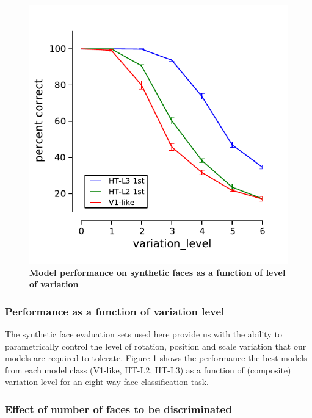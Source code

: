 \begin{figure}[ht]
    \centering
    \includegraphics[scale=0.8]{figures/eight_faces_naturalbg_variation_v1like_a_plus.pdf}
    \caption[]{{\bf Model performance on synthetic faces as a function of level of variation}}
	\label{fig:perf_variation_levels}
\end{figure}

\subsubsection{Performance as a function of variation level}

The synthetic face evaluation sets used here provide us with the ability to parametrically control the level of rotation, position and scale variation that our models are required to tolerate.  Figure \ref{fig:perf_variation_levels} shows the performance the best models from each model class (V1-like, HT-L2, HT-L3) as a function of (composite) variation level for an eight-way face classification task.


\subsubsection{Effect of number of faces to be discriminated}

